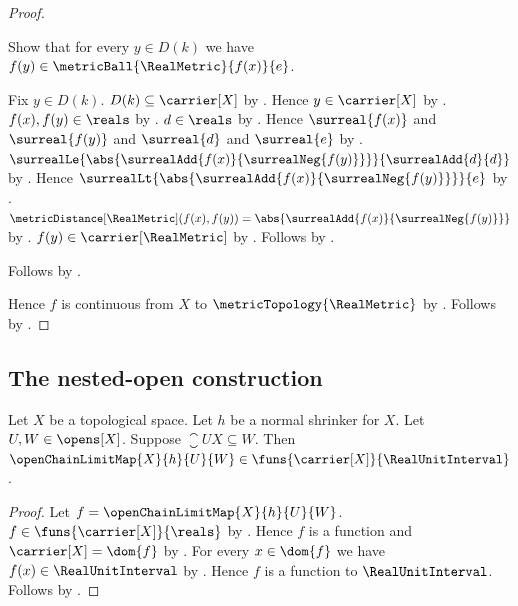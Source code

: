 \begin{proof}
\begin{subproof}
        Show that for every $y\in D(k)$ we have
            $f(y)\in\metricBall{\RealMetric}{f(x)}{e}$.
        \begin{subproof}
            Fix $y\in D(k)$.
            $D(k)\subseteq\carrier[X]$
                by .
            Hence $y\in\carrier[X]$ by .
            $f(x),f(y)\in\reals$ by .
            $d\in\reals$ by .
            Hence $\surreal{f(x)}$ and $\surreal{f(y)}$ and
                $\surreal{d}$ and $\surreal{e}$
                by .
            $\surrealLe{\abs{\surrealAdd{f(x)}{\surrealNeg{f(y)}}}}
                {\surrealAdd{d}{d}}$
                by .
            Hence $\surrealLt{\abs{\surrealAdd{f(x)}{\surrealNeg{f(y)}}}}{e}$
                by .
            $\metricDistance[\RealMetric](f(x),f(y))
                =\abs{\surrealAdd{f(x)}{\surrealNeg{f(y)}}}$
                by .
            $f(y)\in\carrier[\RealMetric]$
                by .
            Follows by .
        \end{subproof}
        Follows by \auto.
    \end{subproof}
    Hence $f$ is continuous from $X$ to
        $\metricTopology{\RealMetric}$
        by .
    Follows by .
\end{proof}

\subsection{The nested-open construction}

\begin{theorem}\label{open_chain_limit_map_typed_unit_interval}
    Let $X$ be a topological space.
    Let $h$ be a normal shrinker for $X$.
    Let $U,W\in\opens[X]$.
    Suppose $\closure{U}{X}\subseteq W$.
    Then $\openChainLimitMap{X}{h}{U}{W}
        \in\funs{\carrier[X]}{\RealUnitInterval}$.
\end{theorem}
\begin{proof}
    Let $f=\openChainLimitMap{X}{h}{U}{W}$.
    $f\in\funs{\carrier[X]}{\reals}$
        by .
    Hence $f$ is a function and $\carrier[X]=\dom{f}$
        by .
    For every $x\in\dom{f}$ we have $f(x)\in\RealUnitInterval$
        by .
    Hence $f$ is a function to $\RealUnitInterval$.
    Follows by .
\end{proof}

